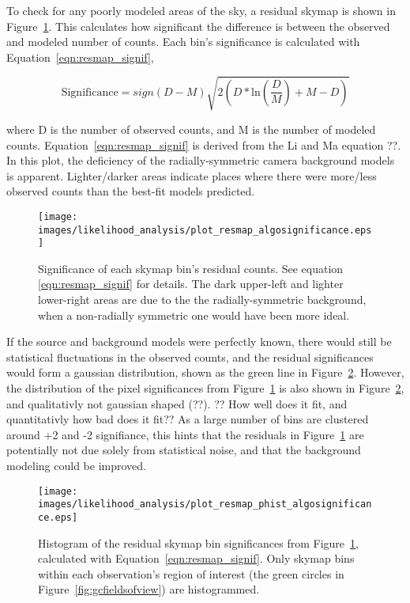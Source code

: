   To check for any poorly modeled areas of the sky, a residual skymap is shown in Figure~\ref{fig:gc_resmap}.
  This calculates how significant the difference is between the observed and modeled number of counts.
  Each bin's significance is calculated with Equation~\ref{eqn:resmap_signif},
  
  \begin{equation}\label{eqn:resmap_signif}
    \text{Significance} = sign(D-M) \sqrt{ 2 \left ( D * \textrm{ln} \left ( \frac{D}{M} \right ) + M - D \right ) }
  \end{equation}
  
  where D is the number of observed counts, and M is the number of modeled counts.
  Equation~\ref{eqn:resmap_signif} is derived from the Li and Ma {\color{red}equation ??}. 
  In this plot, the deficiency of the radially-symmetric camera background models is apparent.
  Lighter/darker areas indicate places where there were more/less observed counts than the best-fit models predicted.
  
  \begin{figure}[ht]
    \centering
    \texttt{[image: images/likelihood\_analysis/plot\_resmap\_algosignificance.eps]}
    \caption[Galactic Center Residual Map]
    {
      Significance of each skymap bin's residual counts.
      See equation \ref{eqn:resmap_signif} for details.
      The dark upper-left and lighter lower-right areas are due to the the radially-symmetric background, when a non-radially symmetric one would have been more ideal.
    }
    \label{fig:gc_resmap}
  \end{figure}

  If the source and background models were perfectly known, there would still be statistical fluctuations in the observed counts, and the residual significances would form a gaussian distribution, shown as the green line in Figure~\ref{fig:gc_resmap_sighist}.
  However, the distribution of the pixel significances from Figure~\ref{fig:gc_resmap} is also shown in Figure~\ref{fig:gc_resmap_sighist}, and qualitativly not gaussian shaped {\color{red}(??)}.
  {\color{red}?? How well does it fit, and quantitativly how bad does it fit??}
  As a large number of bins are clustered around +2 and -2 signifiance, this hints that the residuals in Figure~\ref{fig:gc_resmap} are potentially not due solely from statistical noise, and that the background modeling could be improved.
  
  \begin{figure}[ht]
    \centering
    \texttt{[image: images/likelihood\_analysis/plot\_resmap\_phist\_algosignificance.eps]}
    \caption[Galactic Center Residual Histogram]
    {
      Histogram of the residual skymap bin significances from Figure~\ref{fig:gc_resmap}, calculated with Equation~\ref{eqn:resmap_signif}.
      Only skymap bins within each observation's region of interest (the green circles in Figure~\ref{fig:gcfieldsofview}) are histogrammed.
    }
    \label{fig:gc_resmap_sighist}
  \end{figure}

